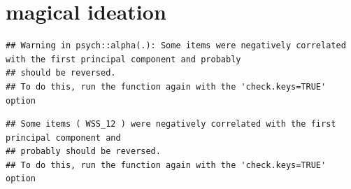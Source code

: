 \documentclass[
]{article}
\newenvironment{Shaded}{\begin{snugshade}}{\end{snugshade}}
\newcommand{\AttributeTok}[1]{\textcolor[rgb]{0.13,0.29,0.53}{#1}}
\newcommand{\FunctionTok}[1]{\textcolor[rgb]{0.13,0.29,0.53}{\textbf{#1}}}
\newcommand{\NormalTok}[1]{#1}
\newcommand{\OtherTok}[1]{\textcolor[rgb]{0.56,0.35,0.01}{#1}}
\newcommand{\SpecialCharTok}[1]{\textcolor[rgb]{0.81,0.36,0.00}{\textbf{#1}}}
\begin{document}
\section{magical ideation}\label{magical-ideation}

\begin{Shaded}
\end{Shaded}

\begin{verbatim}
## Warning in psych::alpha(.): Some items were negatively correlated with the first principal component and probably 
## should be reversed.  
## To do this, run the function again with the 'check.keys=TRUE' option
\end{verbatim}

\begin{verbatim}
## Some items ( WSS_12 ) were negatively correlated with the first principal component and 
## probably should be reversed.  
## To do this, run the function again with the 'check.keys=TRUE' option
\end{verbatim}
\end{document}
